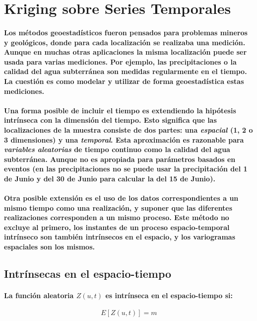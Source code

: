 \section{Kriging sobre Series Temporales}
\paragraph{
Los métodos geoestadísticos fueron pensados para problemas mineros y geológicos, donde para cada localización se realizaba una medición. Aunque en muchas otras aplicaciones la misma localización puede ser usada para varias mediciones. Por ejemplo, las precipitaciones o la calidad del agua subterránea son medidas regularmente en el tiempo. La cuestión es como modelar y utilizar de forma geoestadística estas mediciones.
}
\paragraph{
Una forma posible de incluir el tiempo es extendiendo la hipótesis intrínseca con la dimensión del tiempo. Esto significa que las localizaciones de la muestra consiste de dos partes: una \emph{espacial} (1, 2 o 3 dimensiones) y una \emph{temporal}. Esta aproximación es razonable para \emph{variables aleatorias} de tiempo continuo como la calidad del agua subterránea. Aunque no es apropiada para parámetros basados en eventos (en las precipitaciones no se puede usar la precipitación del 1 de Junio y del 30 de Junio para calcular la del 15 de Junio).
}
\paragraph{
Otra posible extensión es el uso de los datos correspondientes a un mismo tiempo como una realización, y suponer que las diferentes realizaciones corresponden a un mismo proceso. Este método no excluye al primero, los instantes de un proceso espacio-temporal intrínseco son también intrínsecos en el espacio, y los variogramas espaciales son los mismos.
}


\subsection{Intrínsecas en el espacio-tiempo}
\paragraph{
La función aleatoria $Z(u,t)$ es intrínseca en el espacio-tiempo si:
}
\begin{equation}
E[Z(u,t)] = m
\end{equation}
